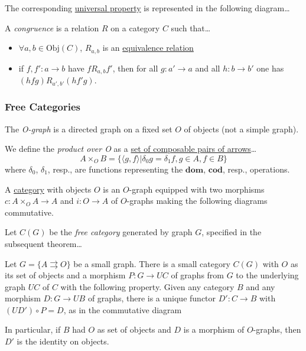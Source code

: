 \noindent The corresponding \hyperref[universality]{universal property} is represented in the following diagram\dots



\label{congruence}
A \emph{congruence} is a relation $R$ on a category $C$ such that\dots
\begin{itemize}
  \item $\forall a,b \in \text{Obj}(C)$, $R_{a,b}$ is an \hyperref[equivalencerelation]{equivalence relation}
  \item if $f,f':a \rightarrow b$ have $f R_{a,b} f'$, then for all $g: a' \rightarrow a$ and all $h: b \rightarrow b'$ one has $(hfg)R_{a',b'}(hf'g)$.
\end{itemize}

\subsubsection{Free Categories}\label{freecategories}

\label{ograph}
The \emph{O-graph} is a directed graph on a fixed set $O$ of objects (not a simple graph). \newline

\noindent We define the \emph{product over O} as a \hyperref[composablepairsofarrows]{set of composable pairs of arrows}\dots
$$A \times_O B = \{ \langle g, f \rangle | \delta_0 g = \delta_1 f, g \in A, f \in B \}$$
where $\delta_0$, $\delta_1$, resp., are functions representing the $\textbf{dom}$, $\textbf{cod}$, resp., operations.\newline

\noindent A \hyperref[category]{category} with objects $O$ is an $O$-graph equipped with two morphisms $c:A \times_O A \rightarrow A$ and $i:O \rightarrow A$
of $O$-graphs making the following diagrams commutative.



\label{freecategory}

Let $C(G)$ be the \emph{free category} generated by graph $G$, specified in the subsequent theorem\dots

\begin{theorem}
Let $G = \{A \rightrightarrows O\}$ be a small graph. There is a small category $C(G)$ with $O$ as its set of objects and a morphism $P: G \rightarrow UC$ of graphs from $G$ to
the underlying graph $UC$ of $C$ with the following property. Given any category $B$ and any morphism $D:G \rightarrow UB$ of graphs, there is a unique functor $D':C \rightarrow B$
with $(UD') \circ P = D$, as in the commutative diagram

\begin{figure}[H]
\centering

\end{figure}

In particular, if $B$ had $O$ as set of objects and $D$ is a morphism of $O$-graphs, then $D'$ is the identity on objects.
\end{theorem}

